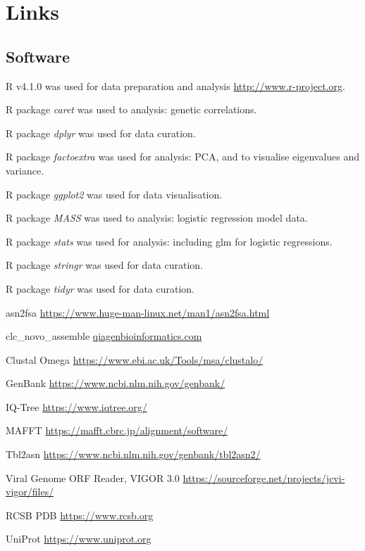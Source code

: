 \documentclass{article}
\begin{document}
\section{Links}
\subsection{Software}
\begin{description}[noitemsep]

\item R v4.1.0 was used for data preparation and analysis \url{http://www.r-project.org}.
\item R package \textit{caret} was used to analysis: genetic correlations.
\item R package \textit{dplyr} was used for data curation.
\item R package \textit{factoextra} was used for analysis: PCA, and to visualise eigenvalues and variance.
\item R package \textit{ggplot2} was used for data visualisation.
\item R package \textit{MASS} was used to analysis: logistic regression model data.
\item R package \textit{stats} was used for analysis: including glm for logistic regressions. 
\item R package \textit{stringr} was used for data curation.
\item R package \textit{tidyr} was used for data curation.
\item asn2fsa \url{https://www.huge-man-linux.net/man1/asn2fsa.html}
\item clc\_novo\_assemble \href{https://resources.qiagenbioinformatics.com/manuals
/clcgenomicsworkbench/852/index.php?manual=De_novo_assembly.html}{qiagenbioinformatics.com} \
\item Clustal Omega \url{https://www.ebi.ac.uk/Tools/msa/clustalo/}
\item GenBank \url{https://www.ncbi.nlm.nih.gov/genbank/}
\item IQ-Tree \url{https://www.iqtree.org/}
\item MAFFT \url{https://mafft.cbrc.jp/alignment/software/} \cite{katoh2013mafft}
\item Tbl2asn \url{https://www.ncbi.nlm.nih.gov/genbank/tbl2asn2/}
\item Viral Genome ORF Reader, VIGOR 3.0 \url{https://sourceforge.net/projects/jcvi-vigor/files/}
\item RCSB PDB	\url{https://www.rcsb.org}
\item UniProt	\url{https://www.uniprot.org}

\end{description}
\end{document}
